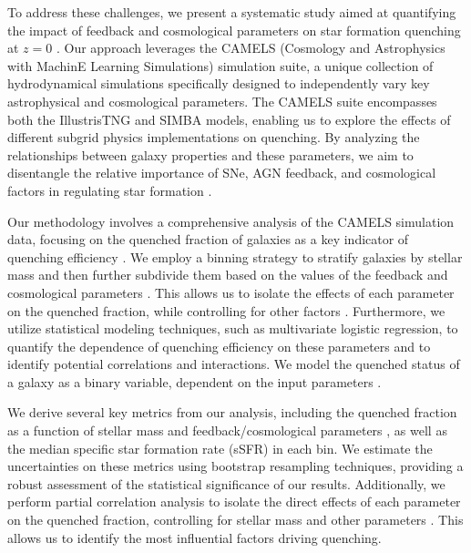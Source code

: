 \documentclass[twocolumn]{aastex631}
\begin{document}
To address these challenges, we present a systematic study aimed at quantifying the impact of feedback and cosmological parameters on star formation quenching at $z=0$  \citep{piotrowska2021quenchingstarformationobserved}. Our approach leverages the CAMELS (Cosmology and Astrophysics with MachinE Learning Simulations) simulation suite, a unique collection of hydrodynamical simulations specifically designed to independently vary key astrophysical and cosmological parameters. The CAMELS suite encompasses both the IllustrisTNG and SIMBA models, enabling us to explore the effects of different subgrid physics implementations on quenching. By analyzing the relationships between galaxy properties and these parameters, we aim to disentangle the relative importance of SNe, AGN feedback, and cosmological factors in regulating star formation  \citep{bluck2023fundamentalsignaturestarformation,kurinchivendhan2024originstarformationquenching}.

Our methodology involves a comprehensive analysis of the CAMELS simulation data, focusing on the quenched fraction of galaxies as a key indicator of quenching efficiency  \citep{xie2024quenchedgalaxieshow}. We employ a binning strategy to stratify galaxies by stellar mass and then further subdivide them based on the values of the feedback and cosmological parameters  \citep{xie2024quenchedgalaxieshow}. This allows us to isolate the effects of each parameter on the quenched fraction, while controlling for other factors  \citep{xie2024quenchedgalaxieshow}. Furthermore, we utilize statistical modeling techniques, such as multivariate logistic regression, to quantify the dependence of quenching efficiency on these parameters and to identify potential correlations and interactions. We model the quenched status of a galaxy as a binary variable, dependent on the input parameters  \citep{xie2024quenchedgalaxieshow}.

We derive several key metrics from our analysis, including the quenched fraction as a function of stellar mass and feedback/cosmological parameters \citep{xie2024quenchedgalaxieshow,xie2024quenchedgalaxieshow,geha2024sagasurveyivstar}, as well as the median specific star formation rate (sSFR) in each bin. We estimate the uncertainties on these metrics using bootstrap resampling techniques, providing a robust assessment of the statistical significance of our results. Additionally, we perform partial correlation analysis to isolate the direct effects of each parameter on the quenched fraction, controlling for stellar mass and other parameters \citep{porrasvalverde2024signatureblackholesquenched}. This allows us to identify the most influential factors driving quenching.
\end{document}
